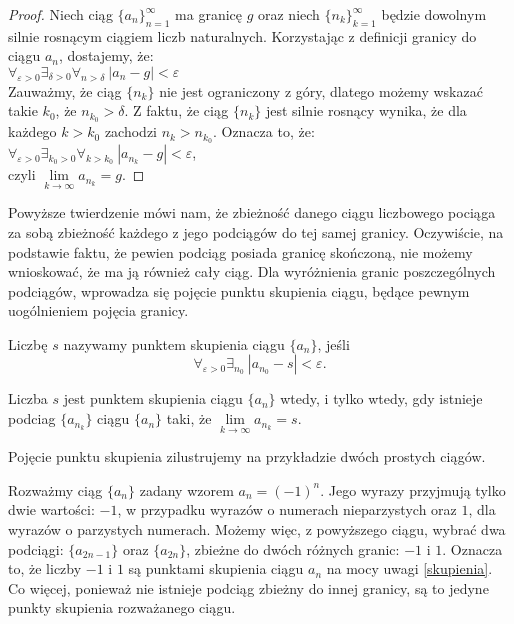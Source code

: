\begin{proof}
Niech ciąg $\{a_n\}_{n=1}^{\infty}$ ma granicę $g$ oraz niech $\{n_k\}_{k=1}^{\infty}$ będzie dowolnym silnie rosnącym ciągiem liczb naturalnych. Korzystając z definicji granicy do ciągu $a_n$, dostajemy, że:\\
$\forall_{\varepsilon>0}\exists_{\delta>0}\forall_{n>\delta}\ |a_n-g|<\varepsilon$\\
  Zauważmy, że ciąg $\{n_k\}$ nie jest ograniczony z góry, dlatego możemy wskazać takie $k_0$, że $n_{k_0}>\delta$. Z faktu, że ciąg $\{n_k\}$ jest silnie rosnący wynika, że dla każdego $k>k_0$ zachodzi $n_k>n_{k_0}$. Oznacza to, że:\\
  $\forall_{\varepsilon>0}\exists_{k_0>0}\forall_{k>k_0}\ |a_{n_k}-g|<\varepsilon$,\\
  czyli $\lim\limits_{k \to \infty}a_{n_k}=g$.
\end{proof}
Powyższe twierdzenie mówi nam, że zbieżność danego ciągu liczbowego pociąga za sobą zbieżność każdego z jego podciągów do tej samej granicy. Oczywiście, na podstawie faktu, że pewien podciąg posiada granicę skończoną, nie możemy wnioskować, że ma ją również cały ciąg. Dla wyróżnienia granic poszczególnych podciągów, wprowadza się pojęcie punktu skupienia ciągu, będące pewnym uogólnieniem pojęcia granicy.
\begin{definicja}
Liczbę $s$ nazywamy punktem skupienia ciągu $\{a_n\}$, jeśli 
\begin{displaymath}
\forall_{\varepsilon>0}\exists_{n_0}\ |a_{n_0}-s|<\varepsilon.
\end{displaymath}
\end{definicja}
\begin{cor}\label{skupienia}
Liczba $s$ jest punktem skupienia ciągu $\{a_n\}$ wtedy, i tylko wtedy, gdy istnieje podciag $\{a_{n_k}\}$ ciągu $\{a_n\}$ taki, że $\lim\limits_{k \to \infty}a_{n_k}=s$.
\end{cor}
Pojęcie punktu skupienia zilustrujemy na przykładzie dwóch prostych ciągów.
\begin{przyklad}
Rozważmy ciąg $\{a_n\}$ zadany wzorem $a_n=(-1)^n$. Jego wyrazy przyjmują tylko dwie wartości: $-1$, w przypadku wyrazów o numerach nieparzystych oraz $1$, dla wyrazów o parzystych numerach. Możemy więc, z powyższego ciągu, wybrać dwa podciągi: $\{a_{2n-1}\}$ oraz $\{a_{2n}\}$, zbieżne do dwóch różnych granic: $-1$ i $1$. Oznacza to, że liczby $-1$ i $1$ są punktami skupienia ciągu $a_n$ na mocy uwagi \ref{skupienia}. Co więcej, ponieważ nie istnieje podciąg zbieżny do innej granicy, są to jedyne punkty skupienia rozważanego ciągu.
\end{przyklad}
